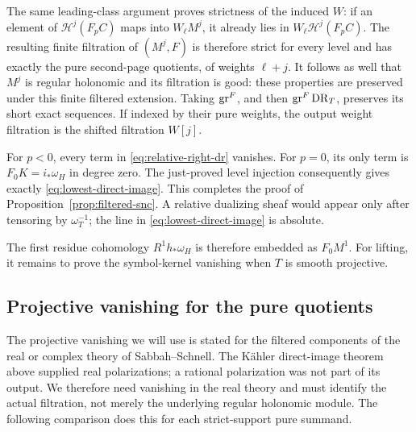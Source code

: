 The same leading-class argument proves strictness of the induced \(W\):
if an element of \(\mathcal H^j(F_pC)\) maps into \(W_\ell M^j\), it
already lies in \(W_\ell\mathcal H^j(F_pC)\).  The resulting finite
filtration of \((M^j,F)\) is therefore strict for every level and has
exactly the pure second-page quotients, of weights \(\ell+j\).
It follows as well that \(M^j\) is regular holonomic and its filtration
is good: these properties are preserved under this finite filtered
extension.  Taking \(\operatorname{gr}^F\), and then \(\operatorname{gr}^F\operatorname{DR}_T\), preserves its
short exact sequences.  If indexed by their pure weights, the output
weight filtration is the shifted filtration \(W[j]\).

For \(p<0\), every term in \eqref{eq:relative-right-dr} vanishes.
For \(p=0\), its only term is \(F_0K=i_*\omega_H\) in degree zero.
The just-proved level injection consequently gives exactly
\eqref{eq:lowest-direct-image}.  This completes the proof of
Proposition~\ref{prop:filtered-snc}.  A relative dualizing sheaf would
appear only after tensoring by \(\omega_T^{-1}\); the line in
\eqref{eq:lowest-direct-image} is absolute.

The first residue cohomology \(R^1h_*\omega_H\) is therefore embedded
as \(F_0M^1\).  For lifting, it remains to prove the symbol-kernel
vanishing when \(T\) is smooth projective.

\subsection{Projective vanishing for the pure quotients}

The projective vanishing we will use is stated for the filtered components
of the real or complex theory of Sabbah--Schnell.  The K\"ahler
direct-image theorem above supplied real polarizations; a rational
polarization was not part of its output.  We therefore need vanishing
in the real theory and must identify the actual filtration, not merely
the underlying regular holonomic module.  The following comparison does
this for each strict-support pure summand.

